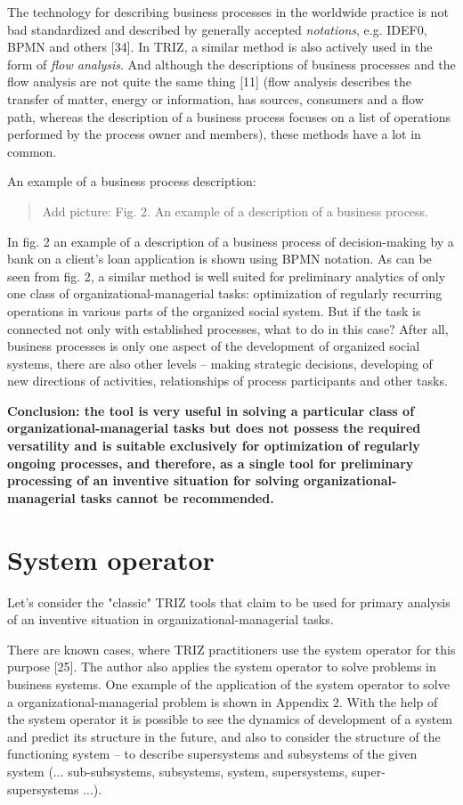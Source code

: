 \documentclass[11pt,a4paper]{book}
\newcommand{\addpicture}[1]{
  \begin{quote} Add picture: #1\end{quote}
}
\begin{document}
The technology for describing business processes in the worldwide practice is
not bad standardized and described by generally accepted \emph{notations},
e.g. IDEF0, BPMN and others [34]. In TRIZ, a similar method is also actively
used in the form of \emph{flow analysis}. And although the descriptions of
business processes and the flow analysis are not quite the same thing [11]
(flow analysis describes the transfer of matter, energy or information, has
sources, consumers and a flow path, whereas the description of a business
process focuses on a list of operations performed by the process owner and
members), these methods have a lot in common.

An example of a business process description:

\addpicture{Fig. 2. An example of a description of a business process.}

In fig. 2 an example of a description of a business process of decision-making
by a bank on a client’s loan application is shown using BPMN notation. As can
be seen from fig. 2, a similar method is well suited for preliminary analytics
of only one class of organizational-managerial tasks: optimization of
regularly recurring operations in various parts of the organized social
system.  But if the task is connected not only with established processes,
what to do in this case? After all, business processes is only one aspect of
the development of organized social systems, there are also other levels --
making strategic decisions, developing of new directions of activities,
relationships of process participants and other tasks.

\textbf{Conclusion: the tool is very useful in solving a particular class of
  organizational-managerial tasks but does not possess the required
  versatility and is suitable exclusively for optimization of regularly
  ongoing processes, and therefore, as a single tool for preliminary
  processing of an inventive situation for solving organizational-managerial
  tasks cannot be recommended.}

\section{System operator}
Let's consider the "classic" TRIZ tools that claim to be used for primary
analysis of an inventive situation in organizational-managerial tasks.

There are known cases, where TRIZ practitioners use the system operator for
this purpose [25].  The author also applies the system operator to solve
problems in business systems. One example of the application of the system
operator to solve a organizational-managerial problem is shown in Appendix 2.
With the help of the system operator it is possible to see the dynamics of
development of a system and predict its structure in the future, and also to
consider the structure of the functioning system -- to describe supersystems
and subsystems of the given system (... sub-subsystems, subsystems, system,
supersystems, super-supersystems ...).
\end{document}
